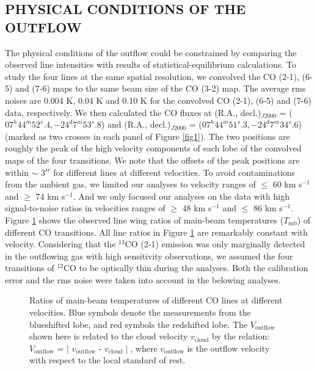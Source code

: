 \subsection{PHYSICAL CONDITIONS OF THE OUTFLOW}
The physical conditions of the outflow could be constrained by comparing the observed line intensities with results of statistical-equilibrium calculations. To study the four lines at the same spatial resolution, we convolved the CO (2-1), (6-5) and (7-6) maps to the same beam size of the CO (3-2) map. The average rms noises are 0.004 K, 0.04 K and 0.10 K for the convolved CO (2-1), (6-5) and (7-6) data, respectively. We then calculated the CO fluxes at (R.A., decl.)$_{J2000}$ = ($07^h44^m52^s.4, -24^d7^m53^s.8$) and (R.A., decl.)$_{J2000}$ = ($07^h44^m51^s.3, -24^d7^m34^s.6$) (marked as two crosses in each panel of Figure \ref{fig1}). The two positions are roughly the peak of the high velocity components of each lobe of the convolved maps of the four transitions. We note that the offsets of the peak positions are within $\sim$ 3$\mbox{$^{\prime\prime}$}$ for different lines at different velocities. To avoid contaminations from the ambient gas, we limited our analyses to velocity ranges of $\le$ 60 km s$^{-1}$ and $\ge$ 74 km s$^{-1}$. And we only focused our analyses on the data with high signal-to-noise ratios in velocities ranges of $\ge$ 48 km s$^{-1}$ and $\le$ 86 km s$^{-1}$. Figure \ref{fig2} shows the observed line wing ratios of main-beam temperatures ($T_{\mathrm{mb}}$) of different CO transitions.  All line ratios in Figure \ref{fig2} are remarkably constant with velocity. Considering that the $^{13}$CO (2-1) emission was only marginally detected in the outflowing gas with high sensitivity observations\citep{2009ApJ...696...66Q}, we assumed the four transitions of $^{12}$CO to be optically thin during the analyses. Both the calibration error and the rms noise were taken into account in the belowing analyses.

\begin{figure}[tbp]
\caption{Ratios of main-beam temperatures of different CO lines at different velocities. Blue symbols denote the measurements from the blueshifted lobe, and red symbols the redshifted lobe. The $V_{\mathrm{outflow}}$ shown here is related to the cloud velocity $v_{\mathrm{cloud}}$ by the relation: $V_{\mathrm{outflow}}$ = $\mid$ $v_{\mathrm{outflow}}$ - $v_{\mathrm{cloud}}\mid$, where $v_{\mathrm{outflow}}$ is the outflow velocity with respect to the local standard of rest. \label{fig2}}
\end{figure}

